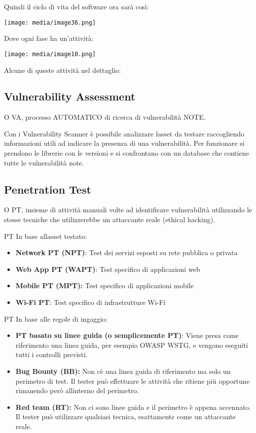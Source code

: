 Quindi il ciclo di vita del software ora sarà così:

\texttt{[image: media/image36.png]}

Dove ogni fase ha un'attività:

\texttt{[image: media/image10.png]}

Alcune di queste attività nel dettaglio:

\subsection{Vulnerability Assessment}\label{vulnerability-assessment}

O VA, processo AUTOMATICO di ricerca di vulnerabilità NOTE.

Con i Vulnerability Scanner è possibile analizzare
l\textquotesingle asset da testare raccogliendo informazioni utili ad
indicare la presenza di una vulnerabilità. Per funzionare si prendono le
librerie con le versioni e si confrontano con un database che contiene
tutte le vulnerabilità note.

\subsection{Penetration Test}\label{penetration-test}

O PT, insieme di attività manuali volte ad identificare vulnerabilità
utilizzando le stesse tecniche che utilizzerebbe un attaccante reale
(ethical hacking).

PT In base all\textquotesingle asset testato:

\begin{itemize}
\item
  \textbf{Network PT (NPT)}: Test dei servizi esposti su rete pubblica o
  privata
\item
  \textbf{Web App PT (WAPT)}: Test specifico di applicazioni web
\item
  \textbf{Mobile PT (MPT):} Test specifico di applicazioni mobile
\item
  \textbf{Wi-Fi PT}: Test specifico di infrastrutture Wi-Fi
\end{itemize}

PT In base alle regole di ingaggio:

\begin{itemize}
\item
  \textbf{PT basato su linee guida (o semplicemente PT)}: Viene presa
  come riferimento una linea guida, per esempio OWASP WSTG, e vengono
  eseguiti tutti i controlli previsti.
\item
  \textbf{Bug Bounty (BB):} Non c\textquotesingle è una linea guida di
  riferimento ma solo un perimetro di test. Il tester può effettuare le
  attività che ritiene più opportune rimanendo però
  all\textquotesingle interno del perimetro.
\item
  \textbf{Red team (RT):} Non ci sono linee guida e il perimetro è
  appena accennato. Il tester può utilizzare qualsiasi tecnica,
  esattamente come un attaccante reale.
\end{itemize}

